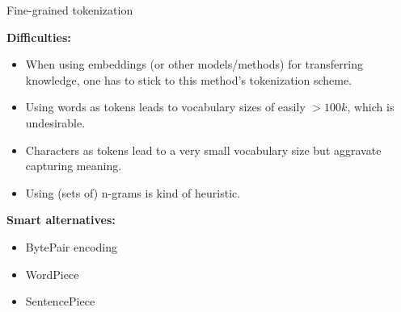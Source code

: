 \documentclass[]{beamer}
\begin{document}
\begin{frame}{Fine-grained tokenization}

	\textbf{Difficulties:}

	\begin{itemize}
		\item When using embeddings (or other models/methods) for transferring knowledge, one has to stick to this method's tokenization scheme.
		\item Using words as tokens leads to vocabulary sizes of easily $> 100k$, which is undesirable.
		\item Characters as tokens lead to a very small vocabulary size but aggravate capturing meaning.
		\item Using (sets of) n-grams is kind of heuristic.
	\end{itemize}
	
	\vspace{.3cm}
	
	\textbf{Smart alternatives:}
	
	\begin{itemize}
		\item BytePair encoding \href{https://www.derczynski.com/papers/archive/BPE_Gage.pdf}{} \href{https://www.aclweb.org/anthology/P16-1162.pdf}{}
		\item WordPiece \href{https://storage.googleapis.com/pub-tools-public-publication-data/pdf/37842.pdf}{} \href{https://arxiv.org/pdf/1609.08144.pdf}{}
		\item SentencePiece \href{https://arxiv.org/pdf/1808.06226.pdf}{}
	\end{itemize}
\end{frame}
\end{document}
